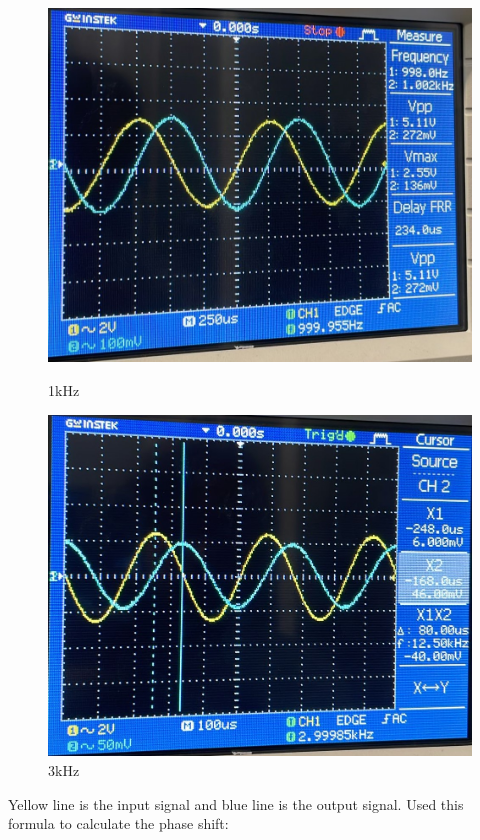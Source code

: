 \begin{figure}[h]
\begin{minipage}{.33\textwidth}
        \includegraphics[width=1\linewidth]{assets/exp2_1k.jpeg}
        \caption{1kHz}
        \label{fig:exp2_1k}
    \end{minipage}%
    \begin{minipage}{.33\textwidth}
        \includegraphics[width=1\linewidth]{assets/exp2_3k.jpeg}
        \caption{3kHz}
        \label{fig:exp2_3k}
    \end{minipage}
\end{figure}

Yellow line is the input signal and blue line is the output signal. Used this formula to calculate the phase shift:


